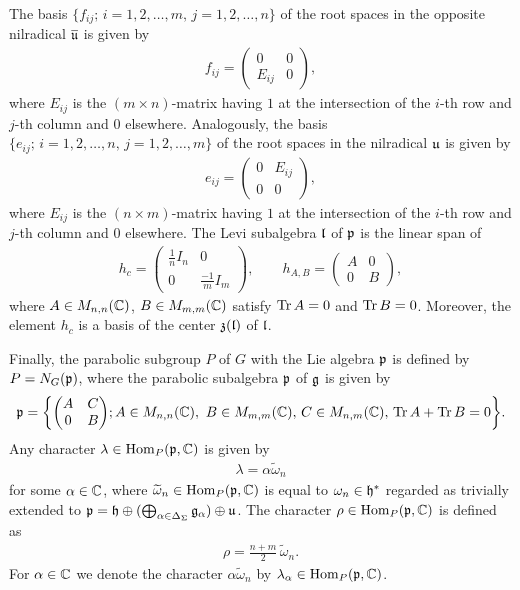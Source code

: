 The basis $\{f_{ij};\, i=1,2,\dots,m,\, j=1,2,\dots,n\}$ of the root spaces in the opposite nilradical $\overline{\mathfrak{u}}$ is given by
\begin{align}
  f_{ij} = \begin{pmatrix}
    0 & 0 \\
    E_{ij} & 0
  \end{pmatrix}\!,
\end{align}
where $E_{ij}$ is the $(m \times n)$-matrix having $1$ at the intersection of the $i$-th row and $j$-th column and $0$ elsewhere. Analogously, the basis $\{e_{ij};\, i=1,2,\dots,n,\, j=1,2,\dots,m\}$ of the root spaces in the nilradical $\mathfrak{u}$ is given by
\begin{align}
  e_{ij} = \begin{pmatrix}
    0 & E_{ij} \\
    0 & 0
  \end{pmatrix}\!,
\end{align}
where $E_{ij}$ is the $(n \times m)$-matrix having $1$ at the intersection of the $i$-th row and $j$-th column and $0$ elsewhere. The Levi subalgebra $\mathfrak{l}$ of $\mathfrak{p}$ is the linear span of
\begin{align}
  h_c = \begin{pmatrix}
    \frac{1}{n} I_n & 0 \\
    0 & \frac{-1}{m} I_m
  \end{pmatrix}\!, \qquad
  h_{A,B} = \begin{pmatrix}
    A & 0 \\
    0 & B
  \end{pmatrix}\!,
\end{align}
where $A \in M_{n,n}(\mathbb{C})$, $B \in M_{m,m}(\mathbb{C})$ satisfy $\operatorname{\mathrm{Tr}} A=0$ and $\operatorname{\mathrm{Tr}} B=0$. Moreover,
the element $h_c$ is a basis of the center $\mathfrak{z}(\mathfrak{l})$ of $\mathfrak{l}$.

Finally, the parabolic subgroup $P$ of $G$ with the Lie algebra $\mathfrak{p}$ is defined by $P=N_G(\mathfrak{p})$, where the parabolic subalgebra $\mathfrak{p}$ of $\mathfrak{g}$ is given by
\begin{align}
  \mathfrak{p}=\left\{\begin{pmatrix}
    A & C \\
    0 & B
  \end{pmatrix}\!;
   A \in M_{n,n}(\mathbb{C}),\ B \in M_{m,m}(\mathbb{C}),\, C \in M_{n,m}(\mathbb{C}),\, \operatorname{\mathrm{Tr}} A + \operatorname{\mathrm{Tr}} B =0
  \right\}\!.
\end{align}
Any character $\lambda \in \mathrm{Hom}_P(\mathfrak{p},\mathbb{C})$ is given by
\begin{align}
  \lambda= \alpha \widetilde{\omega}_n
\end{align}
for some $\alpha \in \mathbb{C}$, where $\widetilde{\omega}_n\in \mathrm{Hom}_P(\mathfrak{p},\mathbb{C})$
is equal to $\omega_n\in \mathfrak{h}^*$ regarded as trivially extended to
$\mathfrak{p} =\mathfrak{h} \oplus (\bigoplus_{\alpha \in \Delta_\Sigma} \mathfrak{g}_\alpha) \oplus \mathfrak{u}$.
The character $\rho \in \mathrm{Hom}_P(\mathfrak{p},\mathbb{C})$  is defined as
\begin{align}
  \rho={\textstyle \frac{n+m}{2}}\,\widetilde{\omega}_n.
\end{align}
For $\alpha \in \mathbb{C}$ we denote the character $\alpha \widetilde{\omega}_n$ by $\lambda_\alpha \in \mathrm{Hom}_P(\mathfrak{p},\mathbb{C})$.
\medskip

